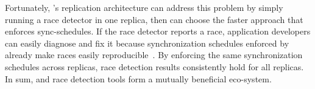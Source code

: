 Fortunately, \xxx's replication architecture can address this problem by simply
running a race detector in one replica, then \xxx can choose the faster \dmt 
approach that enforces sync-schedules. If the race detector reports a race, 
application developers can easily diagnose and fix it because synchronization 
schedules enforced by \dmt already make races easily 
reproducible~\cite{pres:sosp09}. By enforcing the same synchronization 
schedules across replicas, race detection results consistently hold for all 
replicas. In sum, \xxx and race detection tools form a mutually beneficial 
eco-system.
